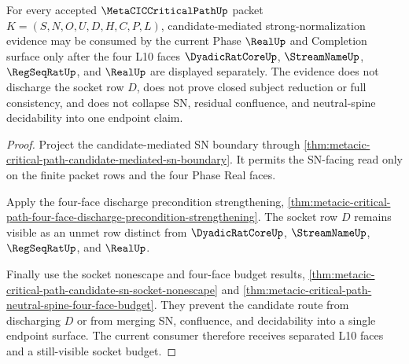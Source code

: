 \begin{theorem}
\label{thm:metacic-critical-path-candidate-sn-discharge}
For every accepted $\MetaCICCriticalPathUp$ packet $K=(S,N,O,U,D,H,C,P,L)$, candidate-mediated strong-normalization evidence may be consumed by the current Phase $\RealUp$ and Completion surface only after the four L10 faces $\DyadicRatCoreUp$, $\StreamNameUp$, $\RegSeqRatUp$, and $\RealUp$ are displayed separately. The evidence does not discharge the socket row $D$, does not prove closed subject reduction or full consistency, and does not collapse SN, residual confluence, and neutral-spine decidability into one endpoint claim.
\end{theorem}
\begin{proof}
Project the candidate-mediated SN boundary through \autoref{thm:metacic-critical-path-candidate-mediated-sn-boundary}. It permits the SN-facing read only on the finite packet rows and the four Phase Real faces.

Apply the four-face discharge precondition strengthening, \autoref{thm:metacic-critical-path-four-face-discharge-precondition-strengthening}. The socket row $D$ remains visible as an unmet row distinct from $\DyadicRatCoreUp$, $\StreamNameUp$, $\RegSeqRatUp$, and $\RealUp$.

Finally use the socket nonescape and four-face budget results, \autoref{thm:metacic-critical-path-candidate-sn-socket-nonescape} and \autoref{thm:metacic-critical-path-neutral-spine-four-face-budget}. They prevent the candidate route from discharging $D$ or from merging SN, confluence, and decidability into a single endpoint surface. The current consumer therefore receives separated L10 faces and a still-visible socket budget.
\end{proof}

